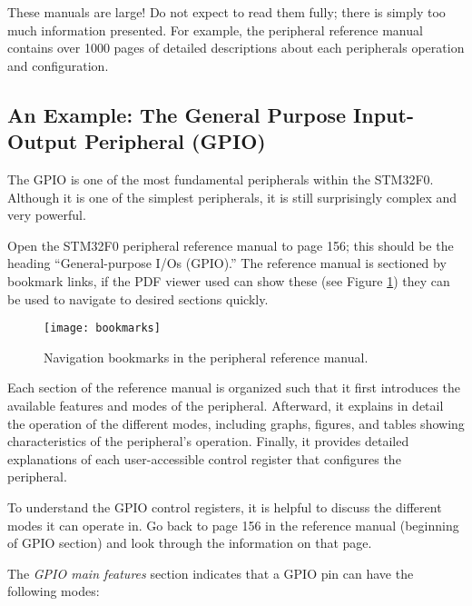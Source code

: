 \documentclass[11pt,fleqn]{book} %
\begin{document}
\begin{warning}
    These manuals are large! Do not expect to read them fully; there is simply too much information presented. For example, the peripheral reference manual contains over 1000 pages of detailed descriptions about each peripherals operation and configuration.
\end{warning}

\subsection{An Example: The General Purpose Input-Output Peripheral (GPIO)}


The GPIO is one of the most fundamental peripherals within the STM32F0. Although it is one of the simplest peripherals, it is still surprisingly complex and very powerful.

Open the STM32F0 peripheral reference manual to page 156; this should be the heading ``General-purpose I/Os (GPIO).'' The reference manual is sectioned by bookmark links, if the PDF viewer used can show these (see Figure \ref{bookmarks}) they can be used to navigate to desired sections quickly.

\begin{figure}[]
    \centering\texttt{[image: bookmarks]}
    \caption{Navigation bookmarks in the peripheral reference manual.}
    \label{bookmarks}
\end{figure}

Each section of the reference manual is organized such that it first introduces the available features and modes of the peripheral. Afterward, it explains in detail the operation of the different modes,  including graphs, figures, and tables showing characteristics of the peripheral's operation. Finally, it provides detailed explanations of each user-accessible control register that configures the peripheral.

To understand the GPIO control registers, it is helpful to discuss the different modes it can operate in. Go back to page 156 in the reference manual (beginning of GPIO section) and look through the information on that page.

The \textit{GPIO main features} section indicates that a GPIO pin can have the following modes:
\end{document}
